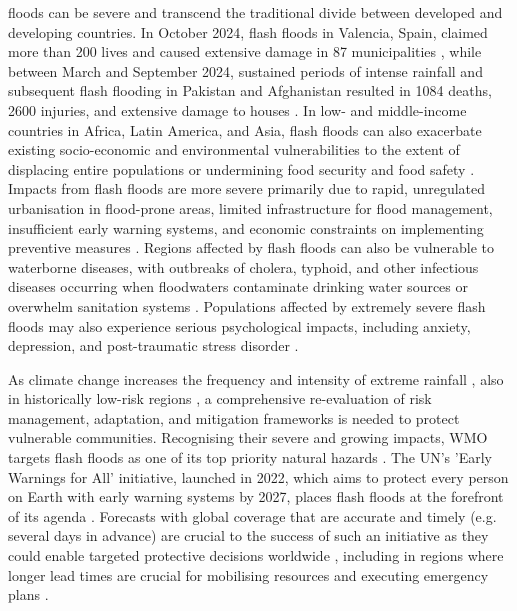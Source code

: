 \noindent floods can be severe and transcend the traditional divide between developed and developing countries. In October 2024, flash floods in Valencia, Spain, claimed more than 200 lives and caused extensive damage in 87 municipalities \citep{Grau-Bove_2024}, while between March and September 2024, sustained periods of intense rainfall and subsequent flash flooding in Pakistan and Afghanistan resulted in 1084 deaths, 2600 injuries, and extensive damage to houses \citep{Wikipedia_2025}. In low- and middle-income countries in Africa, Latin America, and Asia, flash floods can also exacerbate existing socio-economic and environmental vulnerabilities to the extent of displacing entire populations \citep{Stephens_2024} or undermining food security and food safety \citep{Agabiirwe_2022, Duchenne-Moutien_2021}. Impacts from flash floods are more severe primarily due to rapid, unregulated urbanisation in flood-prone areas, limited infrastructure for flood management, insufficient early warning systems, and economic constraints on implementing preventive measures \citep{Douglas_2017, Pinos_2022, Wang_2021b}. Regions affected by flash floods can also be vulnerable to waterborne diseases, with outbreaks of cholera, typhoid, and other infectious diseases occurring when floodwaters contaminate drinking water sources or overwhelm sanitation systems \citep{Lee_2020}. Populations affected by extremely severe flash floods may also experience serious psychological impacts, including anxiety, depression, and post-traumatic stress disorder \citep{Iqbal_2023}. 

As  climate change increases the frequency and intensity of extreme rainfall \citep{WMO_2025, IPCC_2023}, also in historically low-risk regions \citep{Fowler_2021c}, a comprehensive re-evaluation of risk management, adaptation, and mitigation frameworks is needed to protect vulnerable communities. Recognising their severe and growing impacts, WMO targets flash floods as one of its top priority natural hazards \citep{WMO_2025}. The UN's 'Early Warnings for All' initiative, launched in 2022, which aims to protect every person on Earth with early warning systems by 2027, places flash floods at the forefront of its agenda \citep{UN_2022}. Forecasts with global coverage that are accurate and timely (e.g. several days in advance) are crucial to the success of such an initiative as they could enable targeted protective decisions worldwide \citep{Merz_2020}, including in regions where longer lead times are crucial for mobilising resources and executing emergency plans \citep{Bazo_2019}. 


